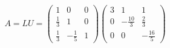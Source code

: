\documentclass[preview]{standalone}
\begin{document}
\begin{align*}
A = L U = \begin{pmatrix}1 & 0 & 0 \\ \frac{1}{3} & 1 & 0 \\ \frac{1}{3} & -\frac{1}{5} & 1\end{pmatrix}\begin{pmatrix}3 & 1 & 1 \\ 0 & -\frac{10}{3} & \frac{2}{3} \\ 0 & 0 & -\frac{16}{5}\end{pmatrix}
\end{align*}
\end{document}
